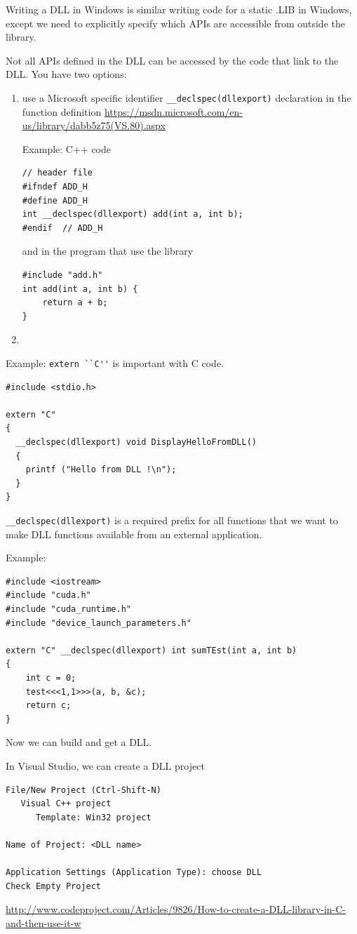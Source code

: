 Writing a DLL in Windows is similar writing code for a static .LIB in Windows,
except we need to explicitly specify which APIs are accessible from outside the
library.


Not all APIs defined in the DLL can be accessed by the code that link to the
DLL. You have two options:
\begin{enumerate}
  \item use a Microsoft specific identifier  \verb!__declspec(dllexport)! declaration in the function definition 
\url{https://msdn.microsoft.com/en-us/library/dabb5z75(VS.80).aspx}

  
Example: C++ code  
\begin{verbatim}
// header file
#ifndef ADD_H
#define ADD_H
int __declspec(dllexport) add(int a, int b);
#endif  // ADD_H
\end{verbatim}

and in the program that use the library 
\begin{verbatim}
#include "add.h"
int add(int a, int b) {
    return a + b;
}
\end{verbatim}
  
  \item
\end{enumerate}

Example: \verb!extern ``C''! is important with C code. 
\begin{verbatim}
#include <stdio.h>

extern "C"
{
  __declspec(dllexport) void DisplayHelloFromDLL()
  {
    printf ("Hello from DLL !\n");
  }
}
\end{verbatim}
\verb!__declspec(dllexport)! is a required prefix for all functions that we
want to make DLL functions available from an external application.


Example: 
\begin{verbatim}
#include <iostream>
#include "cuda.h"
#include "cuda_runtime.h"
#include "device_launch_parameters.h"

extern "C" __declspec(dllexport) int sumTEst(int a, int b)
{
    int c = 0;
    test<<<1,1>>>(a, b, &c);
    return c;
}
\end{verbatim}  

Now we can build and get a DLL.

In Visual Studio, we can create a DLL project
\begin{verbatim}
File/New Project (Ctrl-Shift-N)
   Visual C++ project
      Template: Win32 project
 
Name of Project: <DLL name>

Application Settings (Application Type): choose DLL
Check Empty Project 
\end{verbatim}
\url{http://www.codeproject.com/Articles/9826/How-to-create-a-DLL-library-in-C-and-then-use-it-w}

